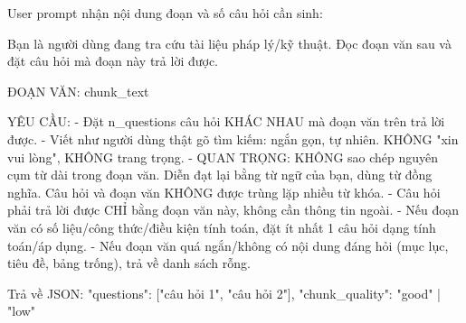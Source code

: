 User prompt nhận nội dung đoạn và số câu hỏi cần sinh:

\begin{promptbox}
Bạn là người dùng đang tra cứu tài liệu pháp lý/kỹ thuật. Đọc đoạn văn sau và đặt câu hỏi mà đoạn này trả lời được.

ĐOẠN VĂN:
{chunk_text}

YÊU CẦU:
- Đặt {n_questions} câu hỏi KHÁC NHAU mà đoạn văn trên trả lời được.
- Viết như người dùng thật gõ tìm kiếm: ngắn gọn, tự nhiên. KHÔNG "xin vui lòng", KHÔNG trang trọng.
- QUAN TRỌNG: KHÔNG sao chép nguyên cụm từ dài trong đoạn văn. Diễn đạt lại bằng từ ngữ của bạn, dùng từ đồng nghĩa. Câu hỏi và đoạn văn KHÔNG được trùng lặp nhiều từ khóa.
- Câu hỏi phải trả lời được CHỈ bằng đoạn văn này, không cần thông tin ngoài.
- Nếu đoạn văn có số liệu/công thức/điều kiện tính toán, đặt ít nhất 1 câu hỏi dạng tính toán/áp dụng.
- Nếu đoạn văn quá ngắn/không có nội dung đáng hỏi (mục lục, tiêu đề, bảng trống), trả về danh sách rỗng.

Trả về JSON:
{"questions": ["câu hỏi 1", "câu hỏi 2"], "chunk_quality": "good" | "low"}
\end{promptbox}
